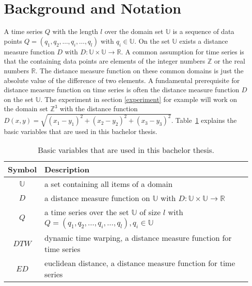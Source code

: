 \section{Background and Notation} \label{background_and_notation}
A time series $Q$ with the length $l$ over the domain set $\mathbb{U}$ is a sequence of data points
$Q = (q_1, q_2, \dots, q_i, \dots, q_l)$ with $q_i \in \mathbb{U}$. On the set $\mathbb{U}$ exists a distance measure
function $D$ with $D: \mathbb{U} \times \mathbb{U} \to \mathbb{R}$. A common assumption for time series is that the
containing data points are elements of the integer numbers $\mathbb{Z}$ or the real numbers $\mathbb{R}$. The distance
measure function on these common domains is just the absolute value of the difference of two elements. A fundamental
prerequisite for distance measure function on time series is often the distance measure function $D$ on the set
$\mathbb{U}$. The experiment in section \ref{experiment} for example will work on the domain set $\mathbb{Z}^3$ with the
distance function $D(x,y) = \sqrt{(x_1-y_1)^2 + (x_2-y_2)^2 + (x_3-y_3)^2}$. Table~\ref{tab:notation} explains the basic
variables that are used in this bachelor thesis.

\begin{table}[H]
    \begin{center}
        \begin{tabularx}{\textwidth}{c X}
            \textbf{Symbol} & \textbf{Description}\\
            \hline
            $\mathbb{U}$ & a set containing all items of a domain\\
            $D$ & a distance measure function on $\mathbb{U}$ with $D: \mathbb{U} \times \mathbb{U} \to \mathbb{R}$\\
            $Q$ & a time series over the set $\mathbb{U}$ of size $l$ with
                $Q = (q_1, q_2, \dots, q_i, \dots, q_l), q_i \in \mathbb{U}$\\
            $DTW$ & dynamic time warping, a distance measure function for time series\\
            $ED$ & euclidean distance, a distance measure function for time series
        \end{tabularx}
    \end{center}
    \caption{Basic variables that are used in this bachelor thesis.}
	\label{tab:notation}
\end{table}





